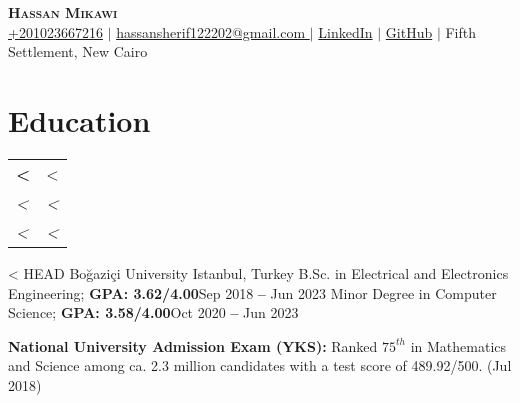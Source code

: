 \documentclass[letterpaper,11pt]{article}
\makeatletter
\newcommand{\resumeSubheading}[4]{\vspace{-2pt}\item
    \begin{tabular*}{0.97\textwidth}[t]{l@{\extracolsep{\fill}}r}
      \textbf{#1} & #2 \\
      \textit{\small#3} & \textit{\small #4} \\
    \end{tabular*}\vspace{-7pt}
}
\newcommand{\resumeEducationHeading}[6]{\vspace{-2pt}\item
    \begin{tabular*}{0.97\textwidth}[t]{l@{\extracolsep{\fill}}r}
      \textbf{#1} & #2 \\
      \textit{\small#3} & \textit{\small #4} \\
      \textit{\small#5} & \textit{\small #6} \\
    \end{tabular*}\vspace{-5pt}
}
\makeatother
\begin{document}
\begin{center}
    \textbf{\Huge \scshape Hassan Mikawi} \\ \vspace{3pt}
    \small 
    \faMobile \hspace{.5pt} \href{tel:+201023667216}{+201023667216} $|$
    \faEnvelope \hspace{.5pt} \href{mailto:hassansherif122202@gmail.com}{hassansherif122202@gmail.com
} $|$
    \faLinkedin \hspace{.5pt} \href{https://www.linkedin.com/in/hassan-sherif-1314b9238}{LinkedIn} $|$
    \faGithub \hspace{.5pt} \href{https://github.com/Hassan220022}{GitHub} $|$
    \hspace{.5pt} {Fifth Settlement, New Cairo}
\end{center}

\section{Education}
\resumeSubHeadingListStart
    \resumeEducationHeading
<<<<<<< HEAD
      {Boğaziçi University
      }{Istanbul, Turkey}
      {B.Sc. in Electrical and Electronics Engineering;   \textbf{GPA: 3.62/4.00}}{Sep 2018 \textbf{--} Jun 2023}
      {Minor Degree in Computer Science;
      \textbf{GPA: 3.58/4.00}}{Oct 2020 \textbf{--} Jun 2023}
        \resumeSubHeadingListStart
        \small{\item{
            \textbf{National University Admission Exam (YKS):} Ranked $75^{th}$ in Mathematics and Science among ca. 2.3 million candidates with a test score of 489.92/500. (Jul 2018)}}
        \resumeSubHeadingListEnd
    
    
\end{document}
